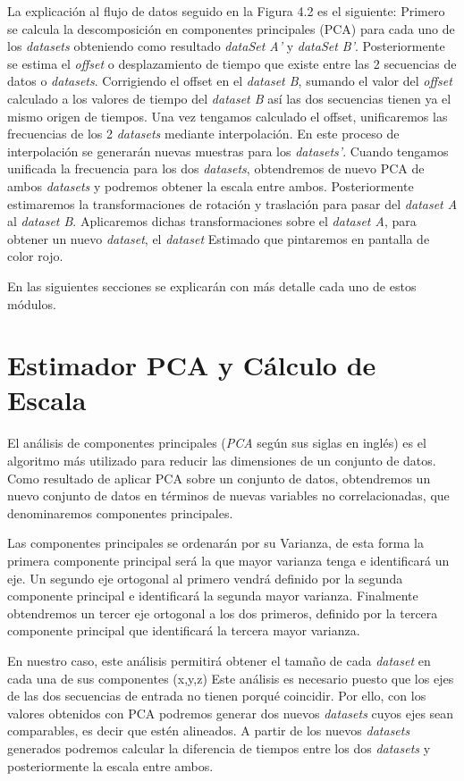 La explicación al flujo de datos seguido en la Figura 4.2 es el siguiente: Primero se calcula la descomposición en componentes principales (PCA) para cada uno de los \textit{datasets} obteniendo como resultado \textit{dataSet A'} y \textit{dataSet B'}. Posteriormente se estima el \textit{offset} o desplazamiento de tiempo que existe entre las 2 secuencias de datos o \textit{datasets}. Corrigiendo el offset en el \textit{dataset B}, sumando el valor del \textit{offset} calculado a los valores de tiempo del \textit{dataset B} así las dos secuencias tienen ya el mismo origen de tiempos. Una vez tengamos calculado el offset, unificaremos las frecuencias de los 2 \textit{datasets} mediante interpolación. En este proceso de interpolación se generarán nuevas muestras para los \textit{datasets'}.
Cuando tengamos unificada la frecuencia para los dos \textit{datasets}, obtendremos de nuevo PCA de ambos \textit{datasets} y podremos obtener la escala entre ambos.
Posteriormente estimaremos la transformaciones de rotación y traslación para pasar del \textit{dataset A} al \textit{dataset B}. Aplicaremos dichas transformaciones sobre el \textit{dataset A}, para obtener un nuevo \textit{dataset}, el \textit{dataset} Estimado que pintaremos en pantalla de color rojo.

En las siguientes secciones se explicarán con más detalle cada uno de estos módulos.


\section{Estimador PCA y Cálculo de Escala}
    El análisis de componentes principales (\textit{PCA} según sus siglas en inglés) es el algoritmo más utilizado para reducir las dimensiones de un conjunto de datos. Como resultado de aplicar PCA sobre un conjunto de datos, obtendremos un nuevo conjunto de datos en términos de nuevas variables no correlacionadas, que denominaremos componentes principales.

    Las componentes principales se ordenarán por su Varianza, de esta forma la primera componente principal será la que mayor varianza tenga e identificará un eje. Un segundo eje ortogonal al primero vendrá definido por la segunda componente principal e identificará la segunda mayor varianza. Finalmente obtendremos un tercer eje ortogonal a los dos primeros, definido por la tercera componente principal que identificará la tercera mayor varianza.

    En nuestro caso, este análisis permitirá obtener el tamaño de cada \textit{dataset} en cada una de sus componentes (x,y,z)
	Este análisis es necesario puesto que los ejes de las dos secuencias de entrada no tienen porqué coincidir. Por ello, con los valores obtenidos con PCA podremos generar dos nuevos \textit{datasets} cuyos ejes sean comparables, es decir que estén alineados. A partir de los nuevos \textit{datasets} generados podremos calcular la diferencia de tiempos entre los dos \textit{datasets} y posteriormente la escala entre ambos.
 
